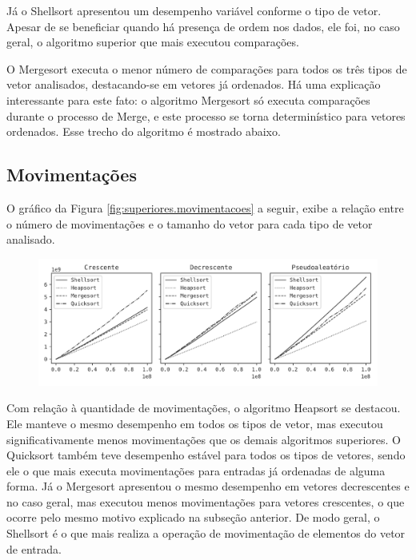 Já o Shellsort apresentou um desempenho variável conforme o tipo de vetor. Apesar de se beneficiar quando há presença de ordem nos dados, ele foi, no caso geral, o algoritmo superior que mais executou comparações.

O Mergesort executa o menor número de comparações para todos os três tipos de vetor analisados, destacando-se em vetores já ordenados. Há uma explicação interessante para este fato: o algoritmo Mergesort só executa comparações durante o processo de Merge, e este processo se torna determinístico para vetores ordenados. Esse trecho do algoritmo é mostrado abaixo.



\subsection{Movimentações}
O gráfico da Figura \ref{fig:superiores.movimentacoes} a seguir, exibe a relação entre o número de movimentações e o tamanho do vetor para cada tipo de vetor analisado.

\begin{figure}[H]
\centering
\includegraphics[scale=0.787]{figuras/pdf/superiores.movimentacoes.pdf}
\end{figure}

Com relação à quantidade de movimentações, o algoritmo Heapsort se destacou. Ele manteve o mesmo desempenho em todos os tipos de vetor, mas executou significativamente menos movimentações que os demais algoritmos superiores. O Quicksort também teve desempenho estável para todos os tipos de vetores, sendo ele o que mais executa movimentações para entradas já ordenadas de alguma forma. Já o Mergesort apresentou o mesmo desempenho em vetores decrescentes e no caso geral, mas executou menos movimentações para vetores crescentes, o que ocorre pelo mesmo motivo explicado na subseção anterior. De modo geral, o Shellsort é o que mais realiza a operação de movimentação de elementos do vetor de entrada.

